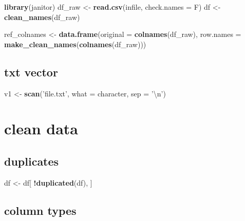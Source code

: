 \documentclass[
]{book}
\newenvironment{Shaded}{\begin{snugshade}}{\end{snugshade}}
\newcommand{\CharTok}[1]{\textcolor[rgb]{0.31,0.60,0.02}{#1}}
\newcommand{\DataTypeTok}[1]{\textcolor[rgb]{0.13,0.29,0.53}{#1}}
\newcommand{\KeywordTok}[1]{\textcolor[rgb]{0.13,0.29,0.53}{\textbf{#1}}}
\newcommand{\NormalTok}[1]{#1}
\newcommand{\OperatorTok}[1]{\textcolor[rgb]{0.81,0.36,0.00}{\textbf{#1}}}
\newcommand{\StringTok}[1]{\textcolor[rgb]{0.31,0.60,0.02}{#1}}
\begin{document}
\begin{Shaded}
\begin{Highlighting}[]
\KeywordTok{library}\NormalTok{(janitor)}
\NormalTok{df_raw <-}\StringTok{ }\KeywordTok{read.csv}\NormalTok{(infile, }\DataTypeTok{check.names =}\NormalTok{ F)}
\NormalTok{df <-}\StringTok{ }\KeywordTok{clean_names}\NormalTok{(df_raw)}

\NormalTok{ref_colnames <-}\StringTok{ }\KeywordTok{data.frame}\NormalTok{(}\DataTypeTok{original =} \KeywordTok{colnames}\NormalTok{(df_raw), }
                           \DataTypeTok{row.names =} \KeywordTok{make_clean_names}\NormalTok{(}\KeywordTok{colnames}\NormalTok{(df_raw)))}
\end{Highlighting}
\end{Shaded}

\hypertarget{txt-vector}{%
\section{txt vector}\label{txt-vector}}

\begin{Shaded}
\begin{Highlighting}[]
\NormalTok{v1 <-}\StringTok{ }\KeywordTok{scan}\NormalTok{(}\StringTok{'file.txt'}\NormalTok{, }\DataTypeTok{what =}\NormalTok{ character, }\DataTypeTok{sep =} \StringTok{'}\CharTok{\textbackslash{}n}\StringTok{'}\NormalTok{)}
\end{Highlighting}
\end{Shaded}

\hypertarget{clean-data}{%
\chapter{clean data}\label{clean-data}}

\hypertarget{duplicates}{%
\section{duplicates}\label{duplicates}}

\begin{Shaded}
\begin{Highlighting}[]
\NormalTok{df <-}\StringTok{ }\NormalTok{df[ }\OperatorTok{!}\KeywordTok{duplicated}\NormalTok{(df), ]}
\end{Highlighting}
\end{Shaded}

\hypertarget{column-types}{%
\section{column types}\label{column-types}}
\end{document}
